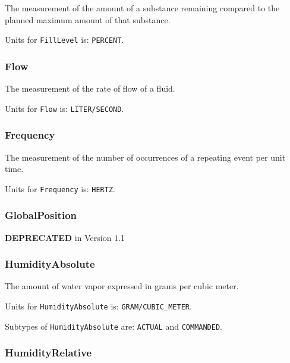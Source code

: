 The measurement of the amount of a substance remaining compared to the planned maximum amount of that substance.


Units for \texttt{FillLevel} is: \texttt{PERCENT}.

\FloatBarrier

\subsubsection{Flow}
  \label{sec:Flow}



The measurement of the rate of flow of a fluid.


Units for \texttt{Flow} is: \texttt{LITER/SECOND}.

\FloatBarrier

\subsubsection{Frequency}
  \label{sec:Frequency}



The measurement of the number of occurrences of a repeating event per unit time.


Units for \texttt{Frequency} is: \texttt{HERTZ}.

\FloatBarrier

\subsubsection{GlobalPosition}
  \label{sec:GlobalPosition}



\textbf{DEPRECATED} in Version 1.1

\FloatBarrier

\subsubsection{HumidityAbsolute}
  \label{sec:HumidityAbsolute}



The amount of water vapor expressed in grams per cubic meter.


Units for \texttt{HumidityAbsolute} is: \texttt{GRAM/CUBIC_METER}.


Subtypes of \texttt{HumidityAbsolute} are: \texttt{ACTUAL} and \texttt{COMMANDED}. 
\FloatBarrier

\subsubsection{HumidityRelative}
  \label{sec:HumidityRelative}



